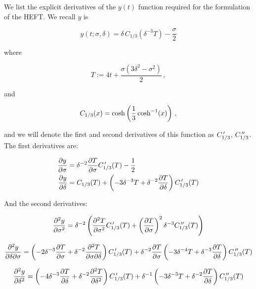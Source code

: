We list the explicit derivatives of the $y(t)$ function required for the formulation of the HEFT. We recall $y$ is

\begin{equation}
	y(t;\sigma,\delta) = \delta \, C_{1/3} \left( \delta^{-3} T \right) - \frac{\sigma}{2}
	\label{}
\end{equation}

where 

\begin{equation}
	T := 4t + \frac{\sigma(3\delta^2-\sigma^2)}{2}\,,
\end{equation}

and

\begin{equation}
	C_{1/3}(x) = \cosh\left( \frac{1}{3} \cosh^{-1}(x) \right)\,,
\end{equation}

and we will denote the first and second derivatives of this function as $C_{1/3}^{\,\prime}$, $C_{1/3}^{\,\prime\prime}$. The first derivatives are:

\begin{align}
	\frac{\partial y}{\partial\sigma} & = \delta^{-2} \frac{\partial T}{\partial\sigma} C_{1/3}^{\,\prime}(T) - \frac{1}{2}\\
	\frac{\partial y}{\partial\delta} & = C_{1/3}(T) + \left(-3 \delta^{-3} T + \delta^{-2} \frac{\partial T}{\partial\delta}\right) C_{1/3}^{\,\prime}(T)
\end{align}

And the second derivatives:

\begin{equation}
	\frac{\partial^2 y}{\partial \sigma^2} = \delta^{-2} \left( \frac{\partial^2 T}{\partial \sigma^2} C_{1/3}^{\,\prime}(T) + \left( \frac{\partial T}{\partial\sigma} \right)^2 \delta^{-3} C_{1/3}^{\,\prime\prime}(T) \right)
	\label{}
\end{equation}

\begin{equation}
	\frac{\partial^2 y}{\partial \delta \partial \sigma} = \left(-2\delta^{-3} \frac{\partial T}{\partial\sigma}  + \delta^{-2} \frac{\partial^2 T}{\partial \sigma \partial \delta} \right) C_{1/3}^{\,\prime}(T) + \delta^{-2} \frac{\partial T}{\partial\sigma} \left( -3\delta^{-4} T + \delta^{-3} \frac{\partial T}{\partial\delta} \right)C_{1/3}^{\,\prime\prime}(T)
	\label{}
\end{equation}


\begin{equation}
	\frac{\partial^2 y}{\partial \delta^2} = 
	\left( -4\delta^{-3} \frac{\partial T}{\partial\delta}  + \delta^{-2}\frac{\partial^2 T}{\partial \delta^2}\right)C_{1/3}^{\,\prime}(T)  + \delta^{-1} \left( -3\delta^{-3} T + \delta^{-2} \frac{\partial T}{\partial\delta} \right)C_{1/3}^{\,\prime\prime}(T)
	\label{}
\end{equation}

